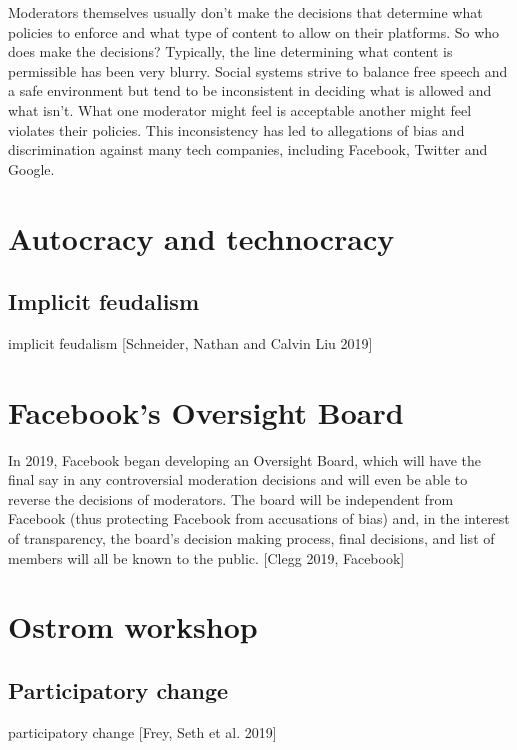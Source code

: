 \documentclass[class=book, crop=false]{standalone}
\begin{document}
Moderators themselves usually don't make the decisions that determine what policies to enforce and what type of content to allow on their platforms. So who does make the decisions? Typically, the line determining what content is permissible has been very blurry. Social systems strive to balance free speech and a safe environment but tend to be inconsistent in deciding what is allowed and what isn't. What one moderator might feel is acceptable another might feel violates their policies. This inconsistency has led to allegations of bias and discrimination against many tech companies, including Facebook, Twitter and Google.

\section{Autocracy and technocracy}

\subsection{Implicit feudalism}

implicit feudalism [Schneider, Nathan and Calvin Liu 2019]

\section{Facebook's Oversight Board}

In 2019, Facebook began developing an Oversight Board, which will have the final say in any controversial moderation decisions and will even be able to reverse the decisions of moderators. The board will be independent from Facebook (thus protecting Facebook from accusations of bias) and, in the interest of transparency, the board's decision making process, final decisions, and list of members will all be known to the public. [Clegg 2019, Facebook]\\

\section{Ostrom workshop}

\subsection{Participatory change}

participatory change [Frey, Seth et al. 2019]
\end{document}
